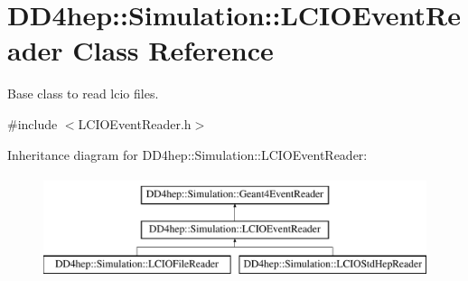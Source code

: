 \hypertarget{class_d_d4hep_1_1_simulation_1_1_l_c_i_o_event_reader}{}\section{D\+D4hep\+:\+:Simulation\+:\+:L\+C\+I\+O\+Event\+Reader Class Reference}
\label{class_d_d4hep_1_1_simulation_1_1_l_c_i_o_event_reader}


Base class to read lcio files.  




{\ttfamily \#include $<$L\+C\+I\+O\+Event\+Reader.\+h$>$}

Inheritance diagram for D\+D4hep\+:\+:Simulation\+:\+:L\+C\+I\+O\+Event\+Reader\+:\begin{figure}[H]
\begin{center}
\leavevmode
\includegraphics[height=3.000000cm]{class_d_d4hep_1_1_simulation_1_1_l_c_i_o_event_reader}
\end{center}
\end{figure}

